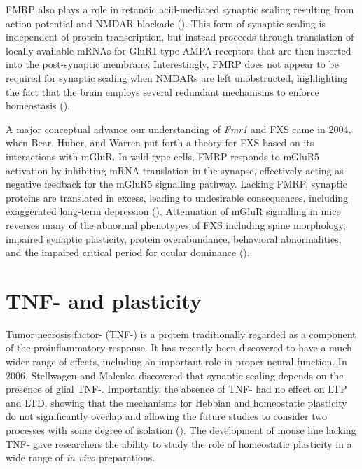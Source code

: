 FMRP also plays a role in retanoic acid-mediated synaptic scaling resulting from action potential and NMDAR blockade (\cite{Soden2010}). This form of synaptic scaling is independent of protein transcription, but instead proceeds through translation of locally-available mRNAs for GluR1-type AMPA receptors that are then inserted into the post-synaptic membrane. Interestingly, FMRP does not appear to be required for synaptic scaling when NMDARs are left unobstructed, highlighting the fact that the brain employs several redundant mechanisms to enforce homeostasis (\cite{Soden2010}).

A major conceptual advance our understanding of \textit{Fmr1} and FXS came in 2004, when Bear, Huber, and Warren put forth a theory for FXS based on its interactions with mGluR. In wild-type cells, FMRP responds to mGluR5 activation by inhibiting mRNA translation in the synapse, effectively acting as negative feedback for the mGluR5 signalling pathway. Lacking FMRP, synaptic proteins are translated in excess, leading to undesirable consequences, including exaggerated long-term depression (\cite{Huber2002, Bear2004}). Attenuation of mGluR signalling in mice reverses many of the abnormal phenotypes of FXS including spine morphology, impaired synaptic plasticity, protein overabundance, behavioral abnormalities, and the impaired critical period for ocular dominance (\cite{DeVrij2008, Dolen2007, Su2011}).

\section{TNF-\textalpha{} and plasticity}

Tumor necrosis factor-\textalpha{} (TNF-\textalpha{}) is a protein traditionally regarded as a component of the proinflammatory response. It has recently been discovered to have a much wider range of effects, including an important role in proper neural function. In 2006, Stellwagen and Malenka discovered that synaptic scaling depends on the presence of glial TNF-\textalpha{}. Importantly, the absence of TNF-\textalpha{} had no effect on LTP and LTD, showing that the mechanisms for Hebbian and homeostatic plasticity do not significantly overlap and allowing the future studies to consider two processes with some degree of isolation (\cite{Stellwagen2006}). The development of mouse line lacking TNF-\textalpha{} gave researchers the ability to study the role of homeostatic plasticity in a wide range of \textit{in vivo} preparations.

